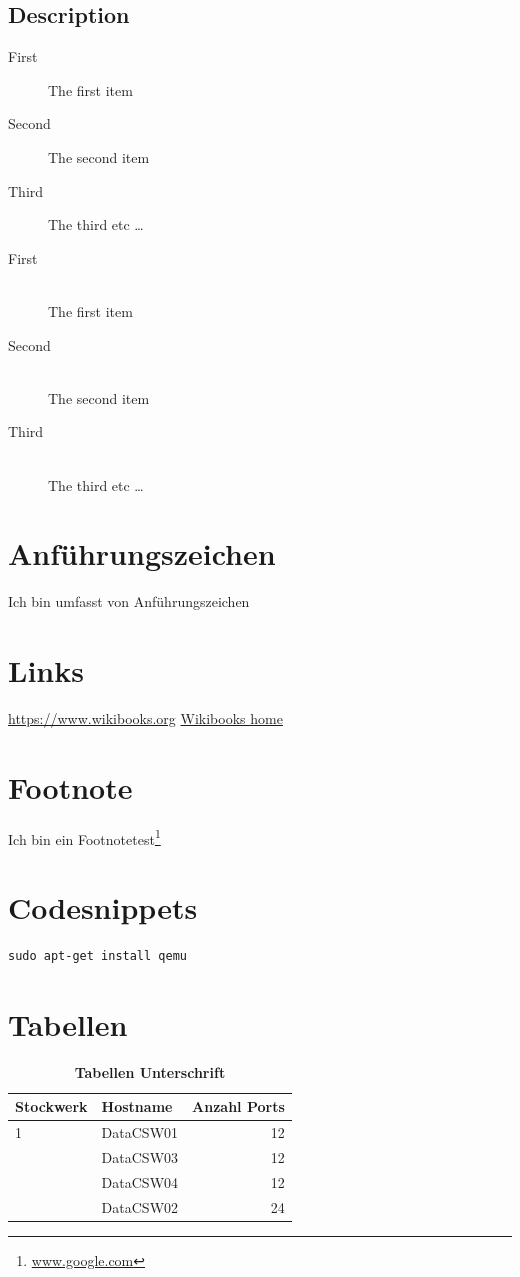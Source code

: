 \subsection{Description}
\begin{description}
  \item[First] The first item
  \item[Second] The second item
  \item[Third] The third etc \ldots
\end{description}
\begin{description}
  \item[First] \hfill \\
  The first item
  \item[Second] \hfill \\
  The second item
  \item[Third] \hfill \\
  The third etc \ldots
\end{description}

\section{Anführungszeichen}
Ich bin umfasst von \flqq Anführungszeichen \frqq{ }

\section{Links}
\url{https://www.wikibooks.org}
\href{https://www.wikibooks.org}{Wikibooks home}

\section{Footnote}
  Ich bin ein Footnotetest\footnote{\url{www.google.com}}



\section{Codesnippets}
\begin{lstlisting}
sudo apt-get install qemu
\end{lstlisting}

\section{Tabellen}

\begin{table}[htb]
\centering
    \begin{tabular}{@{} l l r@{}}\toprule
    {Stockwerk} & {Hostname} & {Anzahl Ports}\\ \midrule
    1 & DataCSW01 & 12\\ \addlinespace
    & DataCSW03 & 12\\ \addlinespace
    & DataCSW04 & 12\\ \addlinespace
    2& DataCSW02 & 24\\
    \bottomrule
    \end{tabular}
\caption{\textbf{Tabellen Unterschrift}}
\end{table}

